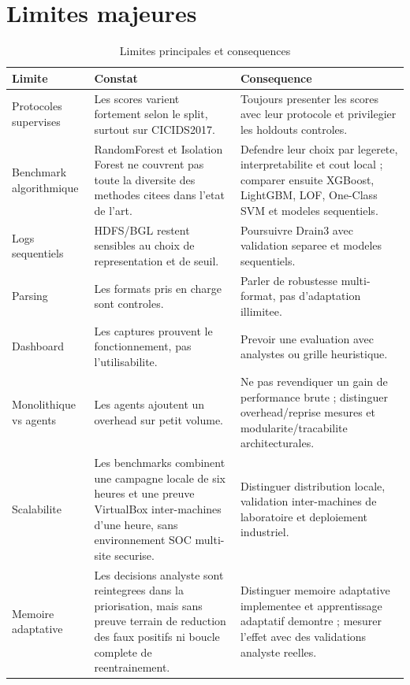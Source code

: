 \section{Limites majeures}
\begin{table}[H]
\centering
\caption{Limites principales et consequences}
\label{tab:limites-principales}
\scriptsize
\begin{tabularx}{\textwidth}{p{3.2cm}X X}
\toprule
\textbf{Limite} & \textbf{Constat} & \textbf{Consequence} \\
\midrule
Protocoles supervises & Les scores varient fortement selon le split, surtout sur CICIDS2017. & Toujours presenter les scores avec leur protocole et privilegier les holdouts controles. \\
Benchmark algorithmique & RandomForest et Isolation Forest ne couvrent pas toute la diversite des methodes citees dans l'etat de l'art. & Defendre leur choix par legerete, interpretabilite et cout local ; comparer ensuite XGBoost, LightGBM, LOF, One-Class SVM et modeles sequentiels. \\
Logs sequentiels & HDFS/BGL restent sensibles au choix de representation et de seuil. & Poursuivre Drain3 avec validation separee et modeles sequentiels. \\
Parsing & Les formats pris en charge sont controles. & Parler de robustesse multi-format, pas d'adaptation illimitee. \\
Dashboard & Les captures prouvent le fonctionnement, pas l'utilisabilite. & Prevoir une evaluation avec analystes ou grille heuristique. \\
Monolithique vs agents & Les agents ajoutent un overhead sur petit volume. & Ne pas revendiquer un gain de performance brute ; distinguer overhead/reprise mesures et modularite/tracabilite architecturales. \\
Scalabilite & Les benchmarks combinent une campagne locale de six heures et une preuve VirtualBox inter-machines d'une heure, sans environnement SOC multi-site securise. & Distinguer distribution locale, validation inter-machines de laboratoire et deploiement industriel. \\
Memoire adaptative & Les decisions analyste sont reintegrees dans la priorisation, mais sans preuve terrain de reduction des faux positifs ni boucle complete de reentrainement. & Distinguer memoire adaptative implementee et apprentissage adaptatif demontre ; mesurer l'effet avec des validations analyste reelles. \\
\bottomrule
\end{tabularx}
\end{table}

